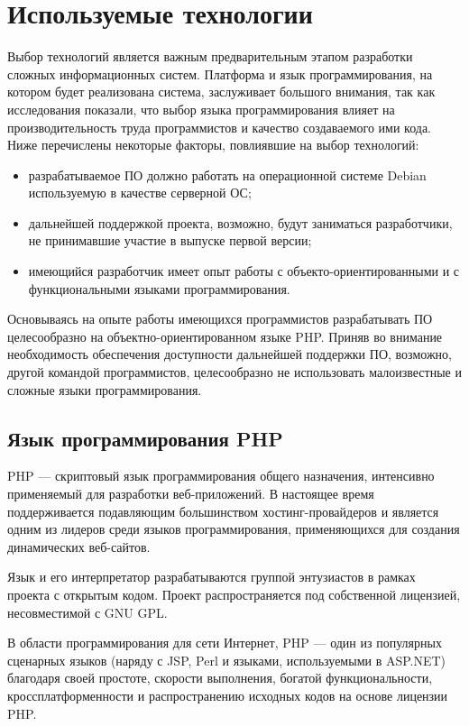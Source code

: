 \section{Используемые технологии}

Выбор технологий является важным предварительным этапом разработки сложных информационных систем. Платформа и язык программирования, на котором будет реализована система, заслуживает большого внимания, так как исследования показали, что выбор языка программирования влияет на производительность труда программистов и качество создаваемого ими кода. Ниже перечислены некоторые факторы, повлиявшие на выбор технологий:
\begin{itemize}
    \item разрабатываемое ПО должно работать на операционной системе Debian используемую в качестве серверной ОС;
    \item дальнейшей поддержкой проекта, возможно, будут заниматься разработчики, не принимавшие участие в выпуске первой версии;
    \item имеющийся разработчик имеет опыт работы с объекто-ориентированными и с функциональными языками программирования.
\end{itemize}

Основываясь на опыте работы имеющихся программистов разрабатывать ПО целесообразно на объектно-ориентированном языке PHP. Приняв во внимание необходимость обеспечения доступности дальнейшей поддержки ПО, возможно, другой командой программистов, целесообразно не использовать малоизвестные и сложные языки программирования.

\subsection{Язык программирования PHP}

PHP — скриптовый язык программирования общего назначения, интенсивно применяемый для разработки веб-приложений. В настоящее время поддерживается подавляющим большинством хостинг-провайдеров и является одним из лидеров среди языков программирования, применяющихся для создания динамических веб-сайтов.

Язык и его интерпретатор разрабатываются группой энтузиастов в рамках проекта с открытым кодом. Проект распространяется под собственной лицензией, несовместимой с GNU GPL.

В области программирования для сети Интернет, PHP — один из популярных сценарных языков (наряду с JSP, Perl и языками, используемыми в ASP.NET) благодаря своей простоте, скорости выполнения, богатой функциональности, кроссплатформенности и распространению исходных кодов на основе лицензии PHP.

